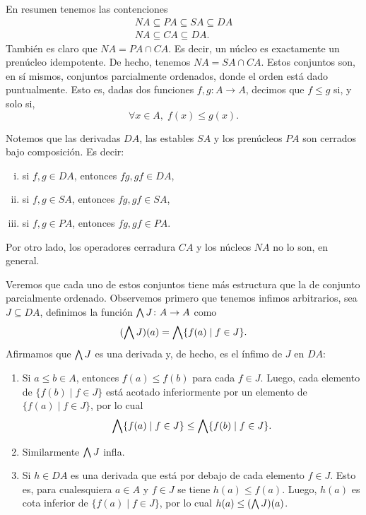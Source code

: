 En resumen tenemos las contenciones
\begin{align*}
  NA \subseteq PA \subseteq SA \subseteq DA \\
  NA \subseteq CA \subseteq DA.
\end{align*}
También es claro que $NA=PA\cap CA$. Es decir, un núcleo es
exactamente un prenúcleo idempotente.
De hecho, tenemos $NA=SA\cap CA$.
Estos conjuntos son, en sí mismos, conjuntos parcialmente
ordenados, donde el orden está dado puntualmente.
Esto es, dadas dos funciones $f,g:A\to A$, decimos que $f\leq g$
si, y solo si,
\[
  \forall x\in A,\; f(x)\leq g(x)
.\]

Notemos que las derivadas $DA$, las estables $SA$ y los
prenúcleos $PA$ son cerrados bajo composición.
Es decir:
\begin{enumerate}[(i)]
  \item si $f,g\in DA$, entonces $fg,gf\in DA$,
  \item si $f,g\in SA$, entonces $fg,gf\in SA$,
  \item si $f,g\in PA$, entonces $fg,gf\in PA$.
\end{enumerate}
Por otro lado, los operadores cerradura $CA$ y los núcleos $NA$
no lo son, en general.





Veremos que cada uno de estos conjuntos tiene más
estructura que la de conjunto parcialmente ordenado. Observemos primero que tenemos infimos arbitrarios, sea $J\subseteq DA$, 
definimos la función $\bigwedge J\colon A\to A$ como
\[
  (\bigwedge J)(a) = \bigwedge\{f(a) \mid f\in J\}
.\]
Afirmamos que $\bigwedge J$ es una derivada y, de hecho, es el ínfimo
de $J$ en $DA$:
\begin{enumerate}[(1)]
  \item
  Si $a\leq b\in A$, entonces $f(a)\leq f(b)$ para cada $f\in J$.
  Luego, cada elemento de $\{f(b)\mid f\in J\}$ está acotado
  inferiormente por un elemento de $\{f(a)\mid f\in J\}$, por lo
  cual
  \[
    \bigwedge\{f(a)\mid f\in J\} \leq \bigwedge\{f(b)\mid f\in J\}
  .\]
  \item
  Similarmente $\bigwedge J$ infla.
  \item
  Si $h\in DA$ es una derivada que está por debajo de cada
  elemento $f\in J$.
  Esto es, para cualesquiera $a\in A$ y $f\in J$ se tiene
  $h(a)\leq f(a)$.
  Luego, $h(a)$ es cota inferior de $\{f(a) \mid f\in J\}$, por
  lo cual $h(a)\leq (\bigwedge J)(a)$.
\end{enumerate}

